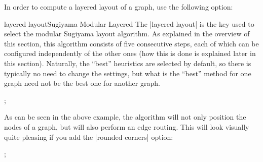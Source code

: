 In order to compute a layered layout of a graph, use the following option:

\begin{gdalgorithm}{layered layout}{Sugiyama Modular Layered}
  The |layered layout| is the key used to select the modular Sugiyama
  layout algorithm. As explained in the overview of this section, this
  algorithm consists of five consecutive steps, each of which can be
  configured independently of the other ones (how this is done is
  explained later in this section). Naturally, the ``best'' heuristics
  are selected by default, so there is typically no need to change the
  settings, but what is the ``best'' method for one graph need not be
  the best one for another graph.
  
\begin{codeexample}[]
\tikz {};    
\end{codeexample}

  As can be seen in the above example, the algorithm will not only
  position the nodes of a graph, but will also perform an edge
  routing. This will look visually quite pleasing if you add the
  |rounded corners| option:

\begin{codeexample}[]
 ;    
\end{codeexample}


\end{gdalgorithm}



